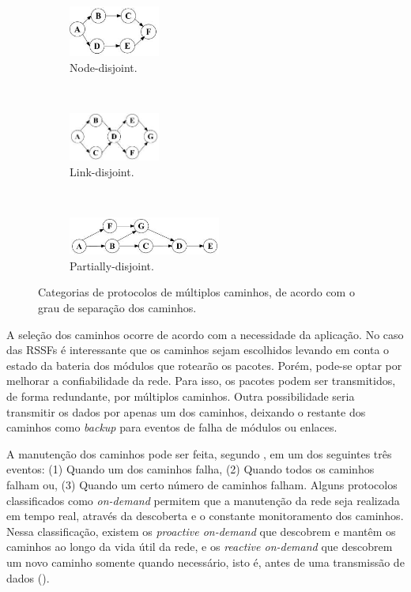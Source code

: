 \begin{figure}[t!]
    \centering
    \begin{subfigure}[t]{0.5\textwidth}
        \centering
        \includegraphics[width=3cm]{figs/nodedisjointa.png}
        \caption{Node-disjoint.}
        \label{Node-disjoint}
    \end{subfigure}%
    ~ 
    \begin{subfigure}[t]{0.5\textwidth}
        \centering
        \includegraphics[width=3cm]{figs/nodedisjointb.png}
        \caption{Link-disjoint.}
        \label{Link-disjoint}
    \end{subfigure}
    ~ 
    \begin{subfigure}[t]{0.5\textwidth}
        \centering
        \includegraphics[width=5cm]{figs/nodedisjointc.png}
        \caption{Partially-disjoint.}
        \label{Partially-disjoint}
    \end{subfigure}
    \caption{Categorias de protocolos de múltiplos caminhos, de acordo com o grau de separação dos caminhos. \cite{radi2012multipath}}
\end{figure}

A seleção dos caminhos ocorre de acordo com a necessidade da aplicação. No caso das \ac{RSSF}s é interessante que os caminhos sejam escolhidos levando em conta o estado da bateria dos módulos que rotearão os pacotes. Porém, pode-se optar por melhorar a confiabilidade da rede. Para isso, os pacotes podem ser transmitidos, de forma redundante, por múltiplos caminhos. Outra possibilidade seria transmitir os dados por apenas um dos caminhos, deixando o restante dos caminhos como \textit{backup} para eventos de falha de módulos ou enlaces.

A manutenção dos caminhos pode ser feita, segundo , em um dos seguintes três eventos: (1) Quando um dos caminhos falha, (2) Quando todos os caminhos falham ou, (3) Quando um certo número de caminhos falham. Alguns protocolos classificados como \textit{on-demand} permitem que a manutenção da rede seja realizada em tempo real, através da descoberta e o constante monitoramento dos caminhos. Nessa classificação, existem os \textit{proactive on-demand} que descobrem e mantêm os caminhos ao longo da vida útil da rede, e os \textit{reactive on-demand} que descobrem um novo caminho somente quando necessário, isto é, antes de uma transmissão de dados ().

